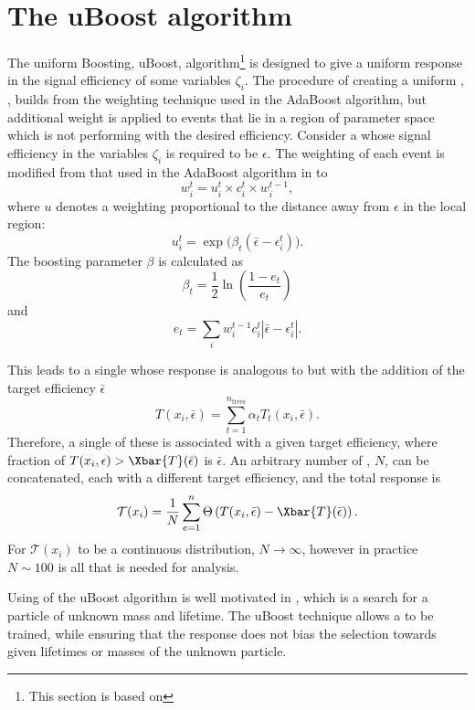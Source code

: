 \section{The uBoost algorithm}
\label{sec:bdt:uboost}
The uniform Boosting, uBoost, algorithm\footnote{
  This section is based on } is designed to give a uniform
response in the signal efficiency of some variables $\zeta_i$.
The procedure of creating a uniform \BDT, \uBDT, builds from the weighting technique used in the
AdaBoost algorithm, but additional weight is applied to events that lie in a region of parameter
space which is not performing with the desired efficiency.
Consider a \BDT whose signal efficiency in the variables $\zeta_i$ is required to be $\epsilon$.
The weighting of each event is modified from that used in the AdaBoost algorithm in 
to
\begin{equation}
  w_i^t = u_i^t\times c_i^t \times w_i^{t-1},
\end{equation}
where $u$ denotes a weighting proportional to the distance away from $\epsilon$ in the local
region:
\begin{equation}
  u_i^t = \exp\big(\beta_t(\bar\epsilon-\epsilon_i^t)\big).
\end{equation}
The boosting parameter $\beta$ is calculated as
\begin{equation}
  \beta_t = \frac12\ln\left(\frac{1-e_t}{e_t}\right)
\end{equation}
and
\begin{equation}
  e_t = \sum_i w_i^{t-1}c_i^t\left|\bar\epsilon-\epsilon_i^t\right|.
\end{equation}

This leads to a single \BDT whose response is analogous to  but with the addition
of the target efficiency $\bar\epsilon$
\begin{equation}
  T(x_i,\bar\epsilon) = \sum_{t=1}^{n_\mathrm{trees}} \alpha_tT_t(x_i,\bar\epsilon).
  \label{eq:ada:fullbdt}
\end{equation}
Therefore, a single of these \BDTs is associated with a given target efficiency, where
fraction of $T(x_i,\epsilon)>\Xbar{T}(\bar\epsilon)$ is $\bar\epsilon$.
An arbitrary number of \BDTs, $N$, can be concatenated, each with a different target efficiency, and
the total response is
\begin{equation}
  \mathcal{T}(x_i) =
  \frac1N\sum_{e=1}^{n}\Theta\left(T(x_i, \bar\epsilon) - \Xbar{T}(\bar\epsilon)\right).
\end{equation}
For $\mathcal{T}(x_i)$ to be a continuous distribution, $N\!\to\infty$, however in practice
$N\sim100$ is all that is needed for analysis.

Using of the uBoost algorithm is well motivated in , which is a search for a particle
of unknown mass and lifetime.
The uBoost technique allows a \BDT to be trained, while ensuring that the response does not bias
the selection towards given lifetimes or masses of the unknown particle.













